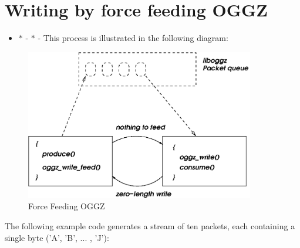 \section{Writing by force feeding OGGZ}
\label{group__force__feed}
\begin{itemize}
\item $\ast$ - $\ast$ - This process is illustrated in the following diagram:\end{itemize}


\begin{figure}[H]
\begin{center}
\includegraphics[width=10cm]{forcefeed}\caption{Force Feeding OGGZ}
\end{center}
\end{figure}


The following example code generates a stream of ten packets, each containing a single byte ('A', 'B', ... , 'J'):



